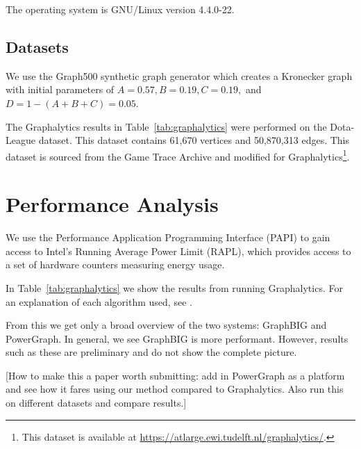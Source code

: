 \documentclass{llncs}
\begin{document}
\begin{table}
	\centering
	\caption{The operating system is GNU/Linux version 4.4.0-22.}
	\label{tab:specs}
\end{table}

\subsection{Datasets}
We use the Graph500 synthetic graph generator which creates a Kronecker graph \cite{Leskovec:2010:Kronecker} with initial parameters of $A = 0.57, B = 0.19, C = 0.19,$ and $D = 1-(A+B+C) = 0.05$.

The Graphalytics results in Table~\ref{tab:graphalytics} were performed on the Dota-League dataset. This dataset contains 61,670 vertices and 50,870,313 edges. This dataset is sourced from the Game Trace Archive\cite{Guo:2012:GTA} and modified for Graphalytics\footnote{This dataset is available at \url{https://atlarge.ewi.tudelft.nl/graphalytics/}.}.

\section{Performance Analysis}

We use the Performance Application Programming Interface (PAPI) \cite{Browne:2000:PAPI} to gain access to Intel's Running Average Power Limit (RAPL), which provides access to a set of hardware counters measuring energy usage.


In Table~\ref{tab:graphalytics} we show the results from running Graphalytics. For an explanation of each algorithm used, see \cite{Iosup:2016:Graphalyticstech}.

From this we get only a broad overview of the two systems: GraphBIG and PowerGraph. In general, we see GraphBIG is more performant. However, results such as these are preliminary and do not show the complete picture.

[How to make this a paper worth submitting: add in PowerGraph as a platform and see how it fares using our method compared to Graphalytics. Also run this on different datasets and compare results.]
\end{document}
